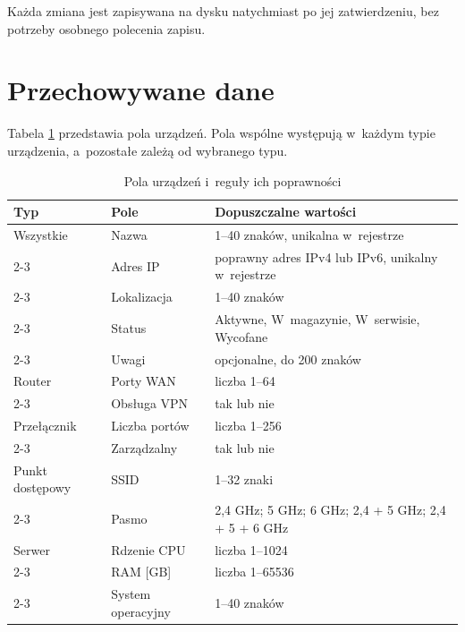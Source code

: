 Każda zmiana jest zapisywana na dysku natychmiast po jej zatwierdzeniu, bez potrzeby osobnego polecenia zapisu.

\section{Przechowywane dane}

Tabela \ref{tab:pola} przedstawia pola urządzeń. Pola wspólne występują w~każdym typie urządzenia, a~pozostałe zależą od wybranego typu.

\begin{table}[H]
	\begin{center}
		\caption{\footnotesize Pola urządzeń i~reguły ich poprawności}
		\label{tab:pola}
		\begin{small}
			\begin{tabular}{|l|l|l|} \hline
				\textbf{Typ} & \textbf{Pole} & \textbf{Dopuszczalne wartości} \\ \hline
				Wszystkie & Nazwa & 1--40 znaków, unikalna w~rejestrze \\ \cline{2-3}
				& Adres IP & poprawny adres IPv4 lub IPv6, unikalny w~rejestrze \\ \cline{2-3}
				& Lokalizacja & 1--40 znaków \\ \cline{2-3}
				& Status & Aktywne, W~magazynie, W~serwisie, Wycofane \\ \cline{2-3}
				& Uwagi & opcjonalne, do 200 znaków \\ \hline
				Router & Porty WAN & liczba 1--64 \\ \cline{2-3}
				& Obsługa VPN & tak lub nie \\ \hline
				Przełącznik & Liczba portów & liczba 1--256 \\ \cline{2-3}
				& Zarządzalny & tak lub nie \\ \hline
				Punkt dostępowy & SSID & 1--32 znaki \\ \cline{2-3}
				& Pasmo & 2,4 GHz; 5 GHz; 6 GHz; 2,4 + 5 GHz; 2,4 + 5 + 6 GHz \\ \hline
				Serwer & Rdzenie CPU & liczba 1--1024 \\ \cline{2-3}
				& RAM [GB] & liczba 1--65536 \\ \cline{2-3}
				& System operacyjny & 1--40 znaków \\ \hline
			\end{tabular}
		\end{small}
	\end{center}
\end{table}

